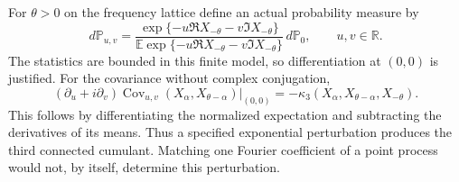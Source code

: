 \documentclass[11pt,reqno]{amsart}
\numberwithin{equation}{section}
\theoremstyle{plain}
\theoremstyle{definition}
\theoremstyle{remark}
\newcommand{\R}{\mathbb R}
\begin{document}
For $\theta>0$ on the frequency lattice define an actual probability measure by
\begin{equation}
 d\mathbb P_{u,v}=\frac{\exp\{-u\Re X_{-\theta}-v\Im X_{-\theta}\}}
 {\mathbb E\exp\{-u\Re X_{-\theta}-v\Im X_{-\theta}\}}\,d\mathbb P_0,
 \qquad u,v\in\R.
 \label{eq:real_tilt}
\end{equation}
The statistics are bounded in this finite model, so differentiation at $(0,0)$ is justified. For the covariance without complex conjugation,
\begin{equation}
 (\partial_u+i\partial_v)
 \operatorname{Cov}_{u,v}(X_\alpha,X_{\theta-\alpha})\big|_{(0,0)}
   =-\kappa_3(X_\alpha,X_{\theta-\alpha},X_{-\theta}).
 \label{eq:tilt_cumulant}
\end{equation}
This follows by differentiating the normalized expectation and subtracting the derivatives of its means. Thus a specified exponential perturbation produces the third connected cumulant. Matching one Fourier coefficient of a point process would not, by itself, determine this perturbation.
\end{document}
